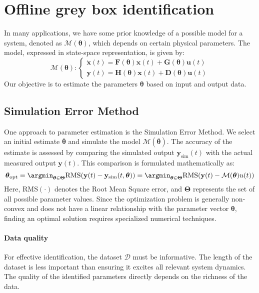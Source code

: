 \section{Offline grey box identification}

In many applications, we have some prior knowledge of a possible model for a system, denoted as $\mathcal{M}(\boldsymbol{\theta})$, which depends on certain physical parameters. 
The model, expressed in state-space representation, is given by:
\[\mathcal{M}(\boldsymbol{\theta}):\begin{cases}
    \dot{\mathbf{x}}(t)=\mathbf{F}(\boldsymbol{\theta})\mathbf{x}(t)+\mathbf{G}(\boldsymbol{\theta})\mathbf{u}(t) \\
    \mathbf{y}(t)=\mathbf{H}(\boldsymbol{\theta})\mathbf{x}(t)+\mathbf{D}(\boldsymbol{\theta})\mathbf{u}(t)
\end{cases}\]
Our objective is to estimate the parameters $\boldsymbol{\theta}$ based on input and output data.

\subsection{Simulation Error Method}
One approach to parameter estimation is the Simulation Error Method. 
We select an initial estimate $\bar{\boldsymbol{\theta}}$ and simulate the model $\mathcal{M}\left(\bar{\boldsymbol{\theta}}\right)$. 
The accuracy of the estimate is assessed by comparing the simulated output $\mathbf{y}_{\text{sim}}(t)$ with the actual measured output $\mathbf{y}(t)$. 
This comparison is formulated mathematically as:
\[\boldsymbol{\theta}_{\text{opt}}=\argmin_{\boldsymbol{\theta}\in\boldsymbol{\Theta}}\text{RMS}(\mathbf{y}(t)-\mathbf{y}_{\text{sim}}(t,\boldsymbol{\theta}))=\argmin_{\boldsymbol{\theta}\in\boldsymbol{\Theta}}\text{RMS}(\mathbf{y}(t)-\mathcal{M}(\boldsymbol{\theta})u(t))\]
Here, $\text{RMS}(\cdot)$ denotes the Root Mean Square error, and $\boldsymbol{\Theta}$ represents the set of all possible parameter values.
Since the optimization problem is generally non-convex and does not have a linear relationship with the parameter vector $\boldsymbol{\theta}$, finding an optimal solution requires specialized numerical techniques.

\paragraph*{Data quality}
For effective identification, the dataset $\mathcal{D}$ must be informative. 
The length of the dataset is less important than ensuring it excites all relevant system dynamics. 
The quality of the identified parameters directly depends on the richness of the data.


